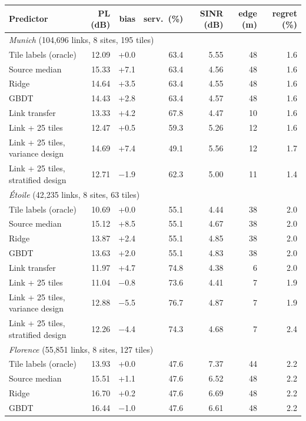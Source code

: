 \begin{tabular}{lrrrrrr}
\toprule
Predictor & PL (dB) & bias & serv.\ (\%) & SINR (dB) & edge (m) & regret (\%) \\
\midrule
\multicolumn{7}{l}{\emph{Munich} (104{,}696 links, 8 sites, 195 tiles)} \\
Tile labels (oracle) & 12.09 & +0.0 & 63.4 & 5.55 & 48 & 1.6 \\
Source median & 15.33 & +7.1 & 63.4 & 4.56 & 48 & 1.6 \\
Ridge & 14.64 & +3.5 & 63.4 & 4.55 & 48 & 1.6 \\
GBDT & 14.43 & +2.8 & 63.4 & 4.57 & 48 & 1.6 \\
Link transfer & 13.33 & +4.2 & 67.8 & 4.47 & 10 & 1.6 \\
Link + 25 tiles & 12.47 & +0.5 & 59.3 & 5.26 & 12 & 1.6 \\
Link + 25 tiles, variance design & 14.69 & +7.4 & 49.1 & 5.56 & 12 & 1.7 \\
Link + 25 tiles, stratified design & 12.71 & \ensuremath{-}1.9 & 62.3 & 5.00 & 11 & 1.4 \\
\multicolumn{7}{l}{\emph{\'Etoile} (42{,}235 links, 8 sites, 63 tiles)} \\
Tile labels (oracle) & 10.69 & +0.0 & 55.1 & 4.44 & 38 & 2.0 \\
Source median & 15.12 & +8.5 & 55.1 & 4.67 & 38 & 2.0 \\
Ridge & 13.87 & +2.4 & 55.1 & 4.85 & 38 & 2.0 \\
GBDT & 13.63 & +2.0 & 55.1 & 4.83 & 38 & 2.0 \\
Link transfer & 11.97 & +4.7 & 74.8 & 4.38 & 6 & 2.0 \\
Link + 25 tiles & 11.04 & \ensuremath{-}0.8 & 73.6 & 4.41 & 7 & 1.9 \\
Link + 25 tiles, variance design & 12.88 & \ensuremath{-}5.5 & 76.7 & 4.87 & 7 & 1.9 \\
Link + 25 tiles, stratified design & 12.26 & \ensuremath{-}4.4 & 74.3 & 4.68 & 7 & 2.4 \\
\multicolumn{7}{l}{\emph{Florence} (55{,}851 links, 8 sites, 127 tiles)} \\
Tile labels (oracle) & 13.93 & +0.0 & 47.6 & 7.37 & 44 & 2.2 \\
Source median & 15.51 & +1.1 & 47.6 & 6.52 & 48 & 2.2 \\
Ridge & 16.70 & +0.2 & 47.6 & 6.69 & 48 & 2.2 \\
GBDT & 16.44 & \ensuremath{-}1.0 & 47.6 & 6.61 & 48 & 2.2 \\

\end{tabular}
